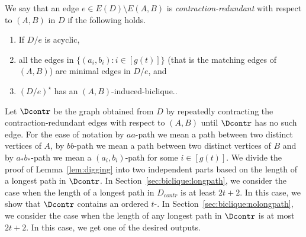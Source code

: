 We say that an edge $e \in E(D) \setminus E(A,B)$ is {\em contraction-redundant} with respect to $(A,B)$ in $D$ if the following holds.

\begin{enumerate}
\item If $D/e$ is acyclic, 
\item all the edges in $\{(a_i,b_i) : i \in [g(t)]\}$ (that is the matching edges of $(A,B)$) are minimal edges in $D/e$, and
\item $(D/e)^{\star}$ has an $(A,B)$-induced-biclique..
\end{enumerate} 

Let $\Dcontr$ be the graph obtained from $D$ by repeatedly contracting the contraction-redundant edges with respect to $(A,B)$ until $\Dcontr$ has no such edge. 
For the ease of notation by $aa$-path we mean a path between two distinct vertices of $A$, by $bb$-path we mean a path between two distinct vertices of $B$ and by $a_{\ast}b_{\ast}$-path we mean a $(a_i,b_i)$-path for some $i \in [g(t)]$.
We divide the proof of Lemma~\ref{lem:digging} into two independent parts based on the length of a longest path in $\Dcontr$. In Section~\ref{sec:biclique:longpath}, we consider the case when the length of a longest path in $D_{contr}$ is at least $2t+2$.
In this case, we show that $\Dcontr$ contains an ordered $t$-\toughpair.
In Section~\ref{sec:biclique:nolongpath}, we consider the case when the length of any longest path in $\Dcontr$ is at most $2t+2$. In this case, we get one of the desired outputs.


